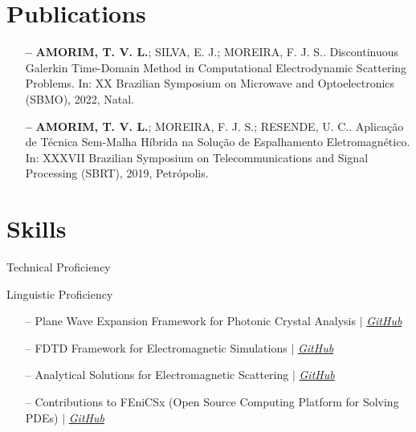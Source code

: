 \documentclass{cv}
\begin{document}
\section{Publications}
\begin{itemize}[leftmargin=10pt]
    \item[\textbf{--}] \textbf{AMORIM, T. V. L.}; SILVA, E. J.; MOREIRA, F. J. S.. Discontinuous Galerkin Time-Domain Method in Computational Electrodynamic Scattering Problems. In: XX Brazilian Symposium on Microwave and Optoelectronics (SBMO), 2022, Natal.
    \item[\textbf{--}] \textbf{AMORIM, T. V. L.}; MOREIRA, F. J. S.; RESENDE, U. C.. Aplicação de Técnica Sem-Malha Híbrida na Solução de Espalhamento Eletromagnético. In: XXXVII Brazilian Symposium on Telecommunications and Signal Processing (SBRT), 2019, Petrópolis.
\end{itemize}

\section{Skills}
Technical Proficiency \vspace{-6pt}
\begin{itemize}
\end{itemize}
Linguistic Proficiency \vspace{-6pt}
\begin{itemize}
\end{itemize}

\begin{itemize}[leftmargin=10pt, itemsep=0pt]
    \item[--] Plane Wave Expansion Framework for Photonic Crystal Analysis
        $|$ \emph{\href{https://github.com/tiagovla/morpho.py}{\color{blue}GitHub}}
    \item[--] FDTD Framework for Electromagnetic Simulations
        $|$ \emph{\href{https://github.com/tiagovla/fdtd.py}{\color{blue}GitHub}}
    \item[--] Analytical Solutions for Electromagnetic Scattering
        $|$ \emph{\href{https://github.com/tiagovla/scatsol}{\color{blue}GitHub}}
    \item[--] Contributions to FEniCSx (Open Source Computing Platform for Solving PDEs)
        $|$ \emph{\href{https://github.com/FEniCS}{\color{blue}GitHub}}
\end{itemize}
\end{document}
